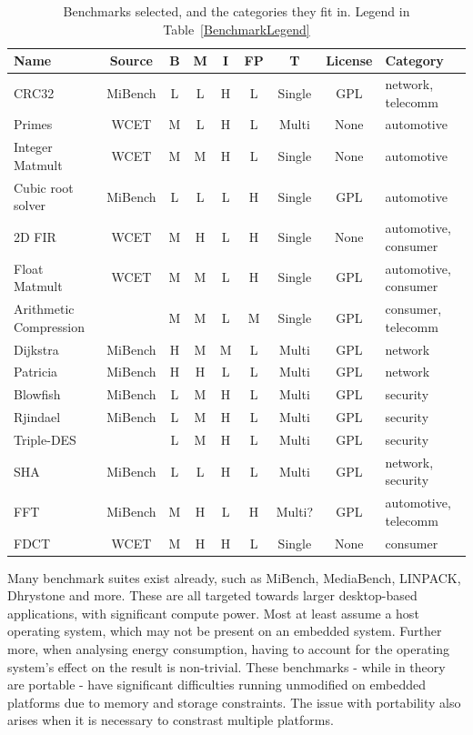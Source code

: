 \documentclass[twocolumn]{article}
\begin{document}
\begin{table}[th!]
\centering
	\begin{tabular}{l c c c c c c c l}
	Name				 	& Source 	& B & M & I & FP& T 		& License & Category \\
	\hline
	CRC32					& MiBench 	& L & L & H & L & Single 	& GPL	& network, telecomm	\\
	Primes					& WCET 		& M & L & H & L & Multi 	& None	& automotive	\\
	Integer Matmult			& WCET	 	& M & M & H & L & Single 	& None	& automotive	\\
	Cubic root solver		& MiBench 	& L & L & L & H & Single 	& GPL	& automotive	\\
	2D FIR					& WCET 		& M & H & L & H & Single 	& None	& automotive, consumer	\\
	Float Matmult			& WCET 		& M & M & L & H & Single 	& GPL	& automotive, consumer	\\
	Arithmetic Compression	&			& M & M & L & M & Single 	& GPL	& consumer, telecomm	\\
	Dijkstra				& MiBench 	& H & M & M & L & Multi 	& GPL	& network	\\
	Patricia				& MiBench 	& H & H & L & L & Multi 	& GPL	& network	\\
	Blowfish				& MiBench 	& L & M & H & L & Multi 	& GPL	& security	\\
	Rjindael				& MiBench 	& L & M & H & L & Multi 	& GPL	& security	\\
	Triple-DES				&		 	& L & M & H & L & Multi 	& GPL	& security	\\
	SHA						& MiBench 	& L & L & H & L & Multi 	& GPL	& network, security	\\
	FFT						& MiBench 	& M & H & L & H & Multi?	&  GPL	& automotive, telecomm	\\
	FDCT					& WCET 		& M & H & H & L & Single 	& None	& consumer	\\
	\end{tabular}
\caption{Benchmarks selected, and the categories they fit in. Legend in Table~\ref{BenchmarkLegend}}
\label{Table:BenchmarkTable}
\end{table}


Many benchmark suites exist already, such as MiBench\cite{Guthaus2001}, MediaBench\cite{Fritts2009}, LINPACK\cite{Dongarra2003}, Dhrystone\cite{Weicker1988} and more. These are all targeted towards larger desktop-based applications, with significant compute power. Most at least assume a host operating system, which may not be present on an embedded system. Further more, when analysing energy consumption, having to account for the operating system’s effect on the result is non-trivial. These benchmarks - while in theory are portable - have significant difficulties running unmodified on embedded platforms due to memory and storage constraints. The issue with portability also arises when it is necessary to constrast multiple platforms.
\end{document}
